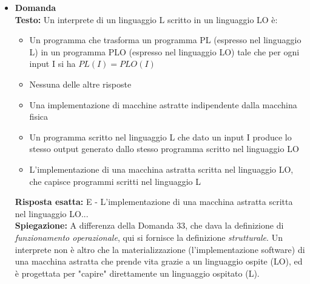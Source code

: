 \documentclass[12pt, a4paper]{article}
\newcounter{domandateoria}
\begin{document}
\begin{itemize}
\newpage

    \item {}\textbf{Domanda \thedomandateoria} \\
    \textbf{Testo:} Un interprete di un linguaggio L scritto in un linguaggio LO è:
    \begin{itemize}
        \item[A)] Un programma che trasforma un programma PL (espresso nel linguaggio L) in un programma PLO (espresso nel linguaggio LO) tale che per ogni input I si ha $PL(I)=PLO(I)$
        \item[B)] Nessuna delle altre risposte
        \item[C)] Una implementazione di macchine astratte indipendente dalla macchina fisica
        \item[D)] Un programma scritto nel linguaggio L che dato un input I produce lo stesso output generato dallo stesso programma scritto nel linguaggio LO
        \item[E)] L'implementazione di una macchina astratta scritta nel linguaggio LO, che capisce programmi scritti nel linguaggio L
    \end{itemize}
    \textbf{Risposta esatta:} E - L'implementazione di una macchina astratta scritta nel linguaggio LO... \\
    \textbf{Spiegazione:} A differenza della Domanda 33, che dava la definizione di \textit{funzionamento operazionale}, qui si fornisce la definizione \textit{strutturale}. Un interprete non è altro che la materializzazione (l'implementazione software) di una macchina astratta che prende vita grazie a un linguaggio ospite (LO), ed è progettata per "capire" direttamente un linguaggio ospitato (L).
    \vspace{0.3cm}


\end{itemize}
\end{document}

